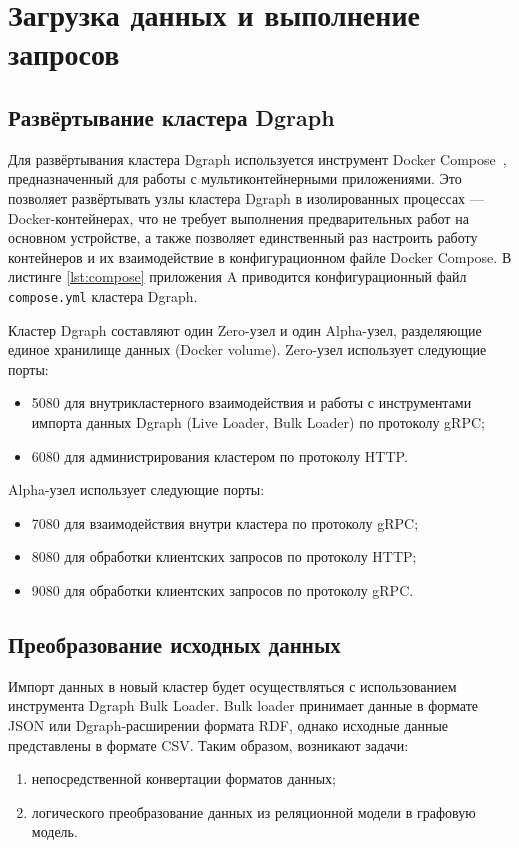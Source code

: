 \section{Загрузка данных и выполнение запросов}

\subsection{Развёртывание кластера Dgraph}

Для развёртывания кластера Dgraph используется инструмент Docker Compose~\cite{dockerCompose}, предназначенный для
работы с мультиконтейнерными приложениями. Это позволяет развёртывать узлы кластера Dgraph в изолированных процессах ---
Docker-контейнерах, что не требует выполнения предварительных работ на основном устройстве, а также позволяет
единственный раз настроить работу контейнеров и их взаимодействие в конфигурационном файле Docker Compose. В листинге
\ref{lst:compose} приложения A приводится конфигурационный файл \texttt{compose.yml} кластера Dgraph.

Кластер Dgraph составляют один Zero-узел и один Alpha-узел, разделяющие единое хранилище данных (Docker volume).
Zero-узел использует следующие порты:
\begin{itemize}
  \item 5080 для внутрикластерного взаимодействия и работы с инструментами импорта данных Dgraph (Live Loader, Bulk
    Loader) по протоколу gRPC;
  \item 6080 для администрирования кластером по протоколу HTTP.
\end{itemize}

Alpha-узел использует следующие порты:
\begin{itemize}
  \item 7080 для взаимодействия внутри кластера по протоколу gRPC;
  \item 8080 для обработки клиентских запросов по протоколу HTTP;
  \item 9080 для обработки клиентских запросов по протоколу gRPC.
\end{itemize}

\subsection{Преобразование исходных данных}

Импорт данных в новый кластер будет осуществляться с использованием инструмента Dgraph Bulk Loader. Bulk loader
принимает данные в формате JSON или Dgraph-расширении формата RDF, однако исходные данные представлены в формате CSV.
Таким образом, возникают задачи:
\begin{enumerate}
  \item непосредственной конвертации форматов данных;
  \item логического преобразование данных из реляционной модели в графовую модель.
\end{enumerate}

